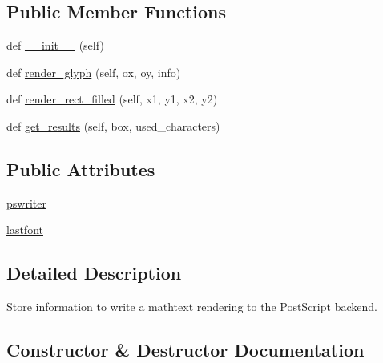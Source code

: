 \subsection*{Public Member Functions}
\begin{DoxyCompactItemize}
\item 
def \hyperlink{classmatplotlib_1_1mathtext_1_1MathtextBackendPs_a3e1071333ee42aa13d490d80c099d38d}{\+\_\+\+\_\+init\+\_\+\+\_\+} (self)
\item 
def \hyperlink{classmatplotlib_1_1mathtext_1_1MathtextBackendPs_a04e084193bb8c111cd69630a012f52f6}{render\+\_\+glyph} (self, ox, oy, info)
\item 
def \hyperlink{classmatplotlib_1_1mathtext_1_1MathtextBackendPs_ae56e8fdff9a16ab2a4c890062712153b}{render\+\_\+rect\+\_\+filled} (self, x1, y1, x2, y2)
\item 
def \hyperlink{classmatplotlib_1_1mathtext_1_1MathtextBackendPs_a343f66ced19a68cb0290fae400da6068}{get\+\_\+results} (self, box, used\+\_\+characters)
\end{DoxyCompactItemize}
\subsection*{Public Attributes}
\begin{DoxyCompactItemize}
\item 
\hyperlink{classmatplotlib_1_1mathtext_1_1MathtextBackendPs_a4bade038c1ff073cdbf316d0aaacc913}{pswriter}
\item 
\hyperlink{classmatplotlib_1_1mathtext_1_1MathtextBackendPs_ace3a58942780885725faa1374222d4e7}{lastfont}
\end{DoxyCompactItemize}


\subsection{Detailed Description}
\begin{DoxyVerb}Store information to write a mathtext rendering to the PostScript backend.
\end{DoxyVerb}
 

\subsection{Constructor \& Destructor Documentation}
\mbox{\label{classmatplotlib_1_1mathtext_1_1MathtextBackendPs_a3e1071333ee42aa13d490d80c099d38d}} 
